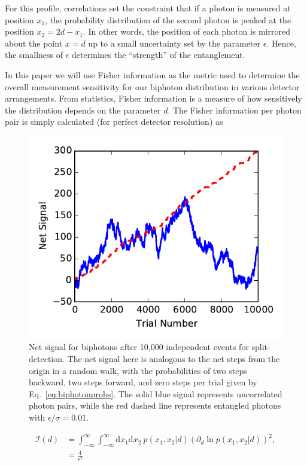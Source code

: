 For this profile, correlations set the constraint that if a photon is measured at position $x_1$, the probability distribution of the second photon is peaked at the position $x_2 = 2d - x_1$.  
In other words, the position of each photon is mirrored about the point $x = d$ up to a small uncertainty set by the parameter $\epsilon$. 
Hence, the smallness of $\epsilon$ determines the ``strength'' of the entanglement. 

In this paper we will use Fisher information \cite{Larsen2001} as the metric used to determine the overall measurement sensitivity for our biphoton distribution in various detector arrangements.  
From statistics, Fisher information is a measure of how sensitively the distribution depends on the parameter $d$.
The Fisher information per photon pair is simply calculated (for perfect detector resolution) as 
\begin{figure}
	\includegraphics[scale=1]{Biphotons/Figures/random-walk.pdf}
	\caption{Net signal for biphotons after 10,000 independent events for split-detection.  
		The net signal here is analogous to the net steps from the origin in a random walk, with the probabilities of two steps backward, two steps forward, and zero steps per trial given by Eq.~\eqref{eq:biphotonprobs}.  
		The solid blue signal represents uncorrelated photon pairs, while the red dashed line represents entangled photons with $\epsilon/\sigma = 0.01$.}
	\label{fig:random walk}
\end{figure}
\begin{align}\label{eq:biphotonFisher}
	\nonumber	\mathcal{I}(d) &= \int^\infty_{-\infty}\int^\infty_{-\infty} \text{d}x_1 \text{d}x_2~ p({x_1,x_2}|d)\left( \partial_d \ln  p({x_1,x_2}|d)\right)^2, \\
	&= \frac{4}{\epsilon^2}
\end{align}
